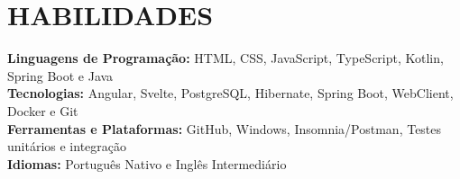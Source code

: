           

\section{HABILIDADES}
\begin{itemize}[leftmargin=0in, label={}]
	\small{\item{
		\textbf{Linguagens de Programação:}
		{HTML, CSS, JavaScript, TypeScript, Kotlin, Spring Boot e Java }
		\vspace{2pt} \\
				
		\textbf{Tecnologias:}
		{Angular, Svelte, PostgreSQL, Hibernate, Spring Boot, WebClient, Docker e Git}
		\vspace{2pt} \\
						     
		\textbf{Ferramentas e Plataformas:}
		{GitHub, Windows, Insomnia/Postman, Testes unitários e integração }
		\vspace{2pt} \\
						     
		\textbf{Idiomas:}
		{Português Nativo e Inglês Intermediário}
	}}
\end{itemize}